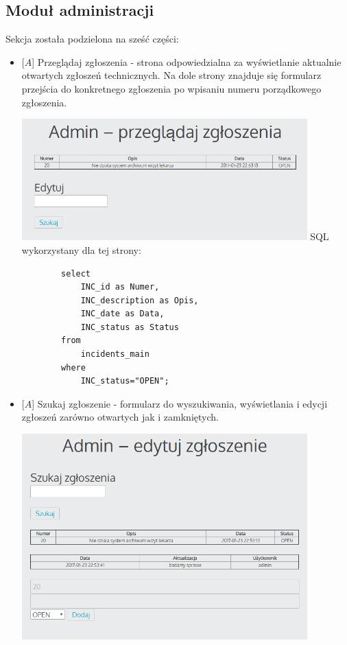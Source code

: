 \documentclass[10pt,a4paper]{article}
\begin{document}
\subsection {Moduł administracji}
Sekcja została podzielona na sześć części:
	\begin{itemize}
		\item $[A$] Przeglądaj zgłoszenia - strona odpowiedzialna za wyświetlanie aktualnie otwartych zgłoszeń technicznych. Na dole strony znajduje się formularz przejścia do konkretnego zgłoszenia po wpisaniu numeru porządkowego zgłoszenia.
		
		\includegraphics[width=11cm]{10}
		\newpage
		SQL wykorzystany dla tej strony:
		\begin{lstlisting}
		select 
			INC_id as Numer, 
			INC_description as Opis, 
			INC_date as Data, 
			INC_status as Status 
		from 
			incidents_main 
		where  
			INC_status="OPEN";
		\end{lstlisting}
		
		\item $[A$] Szukaj zgłoszenie - formularz do wyszukiwania, wyświetlania i edycji zgłoszeń zarówno otwartych jak i zamkniętych.
		
			\includegraphics[width=11cm]{11}
		

\end{itemize}
\end{document}
